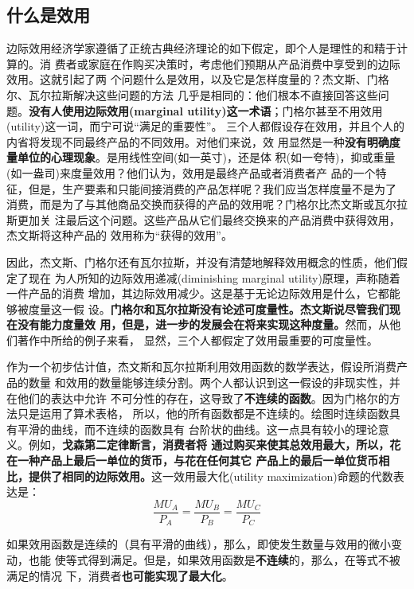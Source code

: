\subsection{什么是效用}

边际效用经济学家遵循了正统古典经济理论的如下假定，即个人是理性的和精于计算的。消
费者或家庭在作购买决策时，考虑他们预期从产品消费中享受到的边际效用。这就引起了两
个问题什么是效用，以及它是怎样度量的？杰文斯、门格尔、瓦尔拉斯解决这些问题的方法
几乎是相同的：他们根本不直接回答这些问题。\textbf{没有人使用边际效用(marginal
  utility)这一术语}；门格尔甚至不用效用(utility)这一词，而宁可说“满足的重要性”。
三个人都假设存在效用，并且个人的内省将发现不同最终产品的不同效用。对他们来说，效
用显然是一种\textbf{没有明确度量单位的心理现象}。是用线性空间(如一英寸)，还是体
积(如一夸特)，抑或重量(如一盎司)来度量效用？他们认为，效用是最终产品或者消费者产
品的一个特征，但是，生产要素和只能间接消费的产品怎样呢？我们应当怎样度量不是为了
消费，而是为了与其他商品交换而获得的产品的效用呢？门格尔比杰文斯或瓦尔拉斯更加关
注最后这个问题。这些产品从它们最终交换来的产品消费中获得效用，杰文斯将这种产品的
效用称为“获得的效用”。

因此，杰文斯、门格尔还有瓦尔拉斯，并没有清楚地解释效用概念的性质，他们假定了现在
为人所知的边际效用递减(diminishing marginal utility)原理，声称随着一件产品的消费
增加，其边际效用减少。这是基于无论边际效用是什么，它都能够被度量这一假
设。\textbf{门格尔和瓦尔拉斯没有论述可度量性。杰文斯说尽管我们现在没有能力度量效
  用，但是，进一步的发展会在将来实现这种度量。}然而，从他们著作中所给的例子来看，
显然，三个人都假定了效用最重要的可度量性。

作为一个初步估计值，杰文斯和瓦尔拉斯利用效用函数的数学表达，假设所消费产品的数量
和效用的数量能够连续分割。两个人都认识到这一假设的非现实性，并在他们的表达中允许
不可分性的存在，这导致了\textbf{不连续的函数}。因为门格尔的方法只是运用了算术表格，
所以，他的所有函数都是不连续的。绘图时连续函数具有平滑的曲线，而不连续的函数具有
台阶状的曲线。这一点具有较小的理论意义。例如，\textbf{戈森第二定律断言，消费者将
  通过购买来使其总效用最大，所以，花在一种产品上最后一单位的货币，与花在任何其它
  产品上的最后一单位货币相比，提供了相同的边际效用。}这一效用最大化(utility
maximization)命题的代数表达是：
\begin{equation}\label{eq:second}
  \frac{MU_A}{P_A} = \frac{MU_B}{P_B} = \frac{MU_C}{P_C}
\end{equation}

如果效用函数是连续的（具有平滑的曲线），那么，即使发生数量与效用的微小变动，也能
使等式得到满足。但是，如果效用函数是\textbf{不连续}的，那么，在等式不被满足的情况
下，消费者\textbf{也可能实现了最大化}。

